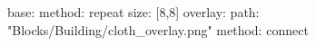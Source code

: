 base:
  method: repeat
  size: [8,8]
overlay:
  path: "Blocks/Building/cloth_overlay.png"
  method: connect